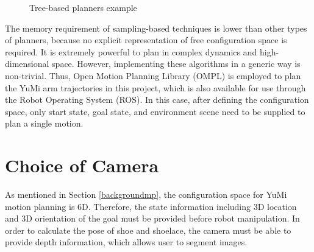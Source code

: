 \begin{figure}[H]
\centering
{}
\caption{Tree-based planners example \citep{OMPLPrim20:online}}
\label{tree}
\end{figure}

The memory requirement of sampling-based techniques is lower than other types of planners, because no explicit representation of free configuration space is required. It is extremely powerful to plan in complex dynamics and high-dimensional space. However, implementing these algorithms in a generic way is non-trivial. Thus, Open Motion Planning Library (OMPL) \citep{OMPL} is employed to plan the YuMi arm trajectories in this project, which is also available for use through the Robot Operating System (ROS).
In this case, after defining the configuration space, only start state, goal state, and environment scene need to be supplied to plan a single motion. 

\section{Choice of Camera}
As mentioned in Section \ref{backgroundmp}, the configuration space for YuMi motion planning is 6D. Therefore, the state information including 3D location and 3D orientation of the goal must be provided before robot manipulation. In order to calculate the pose of shoe and shoelace, the camera must be able to provide depth information, which allows user to segment images. 

